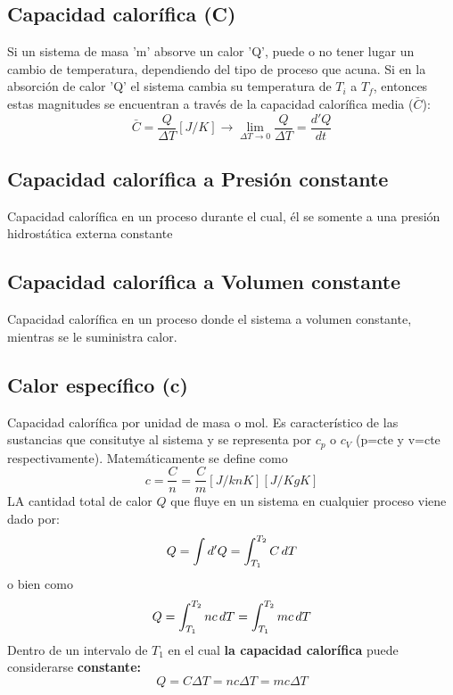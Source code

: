 \documentclass[12pt,twocolumn,a4paper]{report}
\begin{document}
\subsection*{Capacidad calorífica (C)}
Si un sistema de masa 'm' absorve un calor 'Q', puede  o no tener lugar un cambio de temperatura, dependiendo del tipo de proceso que acuna. Si en la absorción de calor 'Q' el sistema cambia su temperatura de $T_i$ a $T_f$, entonces estas magnitudes se encuentran a través de la capacidad calorífica media ($\bar{C}$):
\begin{equation*}
\bar{C} = \frac{Q}{\Delta T} [J/K] \rightarrow \displaystyle\lim_{\Delta T \to 0}\frac{Q}{\Delta T} = \frac{d'Q}{dt}
\end{equation*}

\subsection*{Capacidad calorífica a Presión constante}
 Capacidad calorífica en un proceso durante el cual, él se somente a una presión hidrostática externa constante
\subsection*{Capacidad calorífica a Volumen constante}
 Capacidad calorífica en un proceso donde el sistema a volumen constante, mientras se le suministra calor. 
\subsection*{Calor específico (c)}
Capacidad calorífica por unidad de masa o mol. Es característico de las sustancias que consitutye al sistema y se representa por $c_p$ o $c_V$ (p=cte y v=cte respectivamente). Matemáticamente se define como
\begin{equation*}
c = \frac{C}{n} = \frac{C}{m} [J/knK] [J/KgK]
\end{equation*}
LA cantidad total de calor $Q$ que fluye en un sistema en cualquier proceso viene dado por:
\begin{equation*}
Q = \int d'Q = \int_{T_1}^{T_2}C\thinspace dT 
\end{equation*}
o bien como
\begin{equation*}
Q =\int_{T_1}^{T_2}nc\thinspace dT = \int_{T_1}^{T_2}mc\thinspace dT
\end{equation*}
Dentro de un intervalo de $T_1$ en el cual \textbf{la capacidad calorífica} puede considerarse \textbf{constante:}  
\begin{equation*}
Q =C \Delta T = nc\Delta T = mc\Delta T
\end{equation*}
\end{document}
